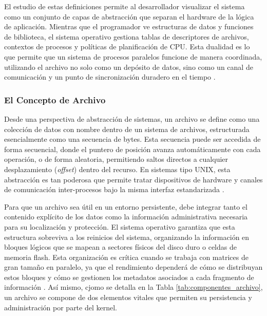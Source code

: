 El estudio de estas definiciones permite al desarrollador visualizar el sistema como un conjunto de capas de abstracción que separan el hardware de la lógica de aplicación. Mientras que el programador ve estructuras de datos y funciones de biblioteca, el sistema operativo gestiona tablas de descriptores de archivos, contextos de procesos y políticas de planificación de CPU. Esta dualidad es lo que permite que un sistema de procesos paralelos funcione de manera coordinada, utilizando el archivo no solo como un depósito de datos, sino como un canal de comunicación y un punto de sincronización duradero en el tiempo \cite{marquez2015, stanford_cs111}.

\subsubsection{El Concepto de Archivo}

Desde una perspectiva de abstracción de sistemas, un archivo se define como una colección de datos con nombre dentro de un sistema de archivos, estructurada esencialmente como una secuencia de bytes. Esta secuencia puede ser accedida de forma secuencial, donde el puntero de posición avanza automáticamente con cada operación, o de forma aleatoria, permitiendo saltos directos a cualquier desplazamiento (\textit{offset}) dentro del recurso. En sistemas tipo UNIX, esta abstracción es tan poderosa que permite tratar dispositivos de hardware y canales de comunicación inter-procesos bajo la misma interfaz estandarizada \cite{ieee2017posix, berkeley_cs162}.

Para que un archivo sea útil en un entorno persistente, debe integrar tanto el contenido explícito de los datos como la información administrativa necesaria para su localización y protección. El sistema operativo garantiza que esta estructura sobreviva a los reinicios del sistema, organizando la información en bloques lógicos que se mapean a sectores físicos del disco duro o celdas de memoria flash. Esta organización es crítica cuando se trabaja con matrices de gran tamaño en paralelo, ya que el rendimiento dependerá de cómo se distribuyan estos bloques y cómo se gestionen los metadatos asociados a cada fragmento de información \cite{stanford_cs111, mit_6828}. Así mismo, cjomo se detalla en la Tabla \ref{tab:componentes_archivo}, un archivo se compone de dos elementos vitales que permiten su persistencia y administración por parte del kernel.

